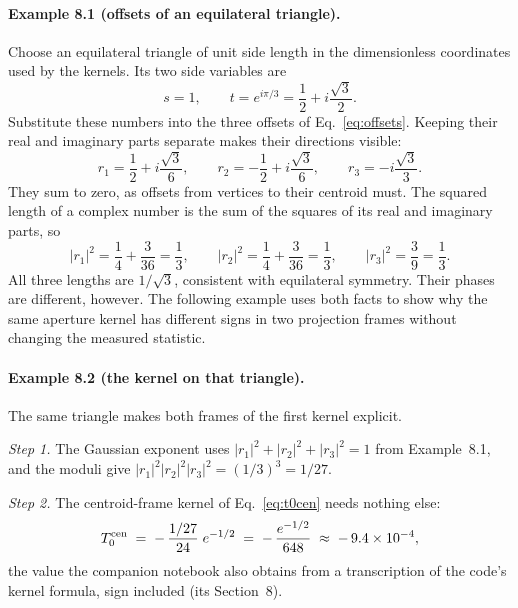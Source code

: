 \documentclass[11pt]{article}
\numberwithin{equation}{section}
\begin{document}
\paragraph{Example 8.1 (offsets of an equilateral triangle).}
Choose an equilateral triangle of unit side length in the dimensionless
coordinates used by the kernels. Its two side variables are
\begin{equation}
 s=1,\qquad t=e^{i\pi/3}=\frac12+i\frac{\sqrt3}{2}.
\end{equation}
Substitute these numbers into the three offsets of
Eq.~\eqref{eq:offsets}. Keeping their real and imaginary parts separate
makes their directions visible:
\begin{equation}
 r_1=\frac12+i\frac{\sqrt3}{6},\qquad
 r_2=-\frac12+i\frac{\sqrt3}{6},\qquad
 r_3=-i\frac{\sqrt3}{3}.
\end{equation}
They sum to zero, as offsets from vertices to their centroid must. The
squared length of a complex number is the sum of the squares of its real
and imaginary parts, so
\begin{equation}
 |r_1|^2=\frac14+\frac{3}{36}=\frac13,\qquad
 |r_2|^2=\frac14+\frac{3}{36}=\frac13,\qquad
 |r_3|^2=\frac{3}{9}=\frac13.
\end{equation}
All three lengths are $1/\sqrt3$, consistent with equilateral symmetry.
Their phases are different, however. The following example uses both
facts to show why the same aperture kernel has different signs in two
projection frames without changing the measured statistic.

\paragraph{Example 8.2 (the kernel on that triangle).}
The same triangle makes both frames of the first kernel explicit.

\emph{Step 1.}  The Gaussian exponent uses
$|r_1|^2 + |r_2|^2 + |r_3|^2 = 1$ from Example~8.1, and the moduli
give $|r_1|^2 |r_2|^2 |r_3|^2 = (1/3)^3 = 1/27$.

\emph{Step 2.}  The centroid-frame kernel of Eq.~\eqref{eq:t0cen}
needs nothing else:
\begin{equation}
  T_0^{\rm cen} \;=\; -\,\frac{1/27}{24}\; e^{-1/2}
  \;=\; -\,\frac{e^{-1/2}}{648}
  \;\approx\; -\,9.4\times 10^{-4} ,
  \label{eq:t0equilateral}
\end{equation}
the value the companion notebook also obtains from a transcription
of the code's kernel formula, sign included (its Section~8).
\end{document}
